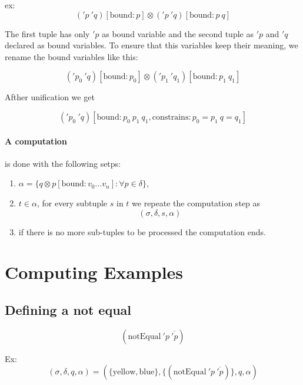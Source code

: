\documentclass[11pt,a4paper]{report}
\newcommand{\var}[1]{'#1}
\newcommand{\unify}{\otimes}
\begin{document}
ex: 
\[
    (\var{p}\ \var{q})[\text{bound}: p] \unify (\var{p}\ \var{q})[\text{bound}: p\ q]
\]

The first tuple has only $\var{p}$ as bound variable and the second tuple as $\var{p}$ and $\var{q}$ declared as bound variables.
To ensure that this variables keep their meaning, we rename the bound variables like this:

\[
    (\var{p_{0}}\ \var{q})[\text{bound}: p_{0}] \unify (\var{p_{1}}\ \var{q_{1}})[\text{bound}: p_{1}\ q_{1}]
\]

Afther unification we get

\[
    (\var{p_{0}}\ \var{q})[\text{bound}: p_{0}\ p_{1}\ q_{1}, \text{constrains}: p_{0}=p_{1}\ q=q_{1}]
\]



\paragraph{A computation} is done with the following setps:

\begin{enumerate}
    \item $\alpha = \{q \unify p[\text{bound}: v_{0} \ldots v_{n}] :\forall p \in \delta\}$,
    \item $t \in \alpha$, for every subtuple $s$ in $t$ we repeate the computation step as
    \[(\sigma, \delta, s, \alpha)\]
    \item if there is no more sub-tuples to be processed the computation ends.
\end{enumerate}

\section{Computing Examples}

\subsection{Defining a not equal}

\[ 
    (\text{notEqual}\ \var{p}\ \overline{\var{p}})
\] 

Ex:
\[(\sigma, \delta, q, \alpha ) = (\{\text{yellow}, \text{blue}\}, \{(\text{notEqual}\ \var{p}\ \overline{\var{p}})\}, q, \alpha)\]
\end{document}
